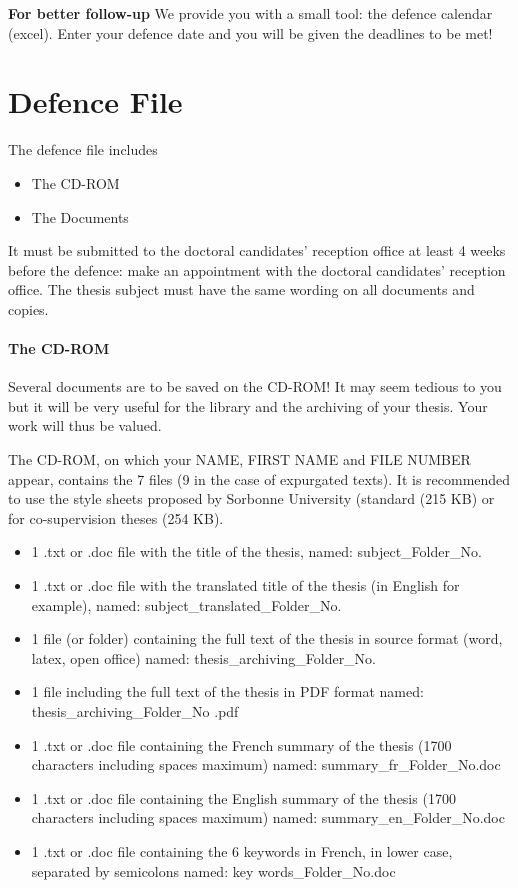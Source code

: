 \textbf{For better follow-up}
We provide you with a small tool: the defence calendar (excel). Enter your defence date and you will be given the deadlines to be met!

\section{Defence File}
\label{sec:defence-file}

The defence file includes

\begin{itemize}
    \item The CD-ROM
    \item The Documents
\end{itemize}

It must be submitted to the doctoral candidates' reception office at least 4 weeks before the defence: make an appointment with the doctoral candidates' reception office.
The thesis subject must have the same wording on all documents and copies.

\paragraph{The CD-ROM}
Several documents are to be saved on the CD-ROM! It may seem tedious to you but it will be very useful for the library and the archiving of your thesis. Your work will thus be valued. 

The CD-ROM, on which your NAME, FIRST NAME and FILE NUMBER appear, contains the 7 files (9 in the case of expurgated texts). It is recommended to use the style sheets proposed by Sorbonne University (standard (215 KB) or for co-supervision theses (254 KB). 

\begin{itemize}
    \item 1 .txt or .doc file with the title of the thesis, named: subject\_Folder\_No.
    \item 1 .txt or .doc file with the translated title of the thesis (in English for example), named: subject\_translated\_Folder\_No.
    \item 1 file (or folder) containing the full text of the thesis in source format (word, latex, open office) named: thesis\_archiving\_Folder\_No.
    \item 1 file including the full text of the thesis in PDF format named:
    thesis\_archiving\_Folder\_No .pdf
    \item 1 .txt or .doc file containing the French summary of the thesis (1700 characters including spaces maximum) named: summary\_fr\_Folder\_No.doc
    \item 1 .txt or .doc file containing the English summary of the thesis (1700 characters including spaces maximum) named: summary\_en\_Folder\_No.doc
    \item 1 .txt or .doc file containing the 6 keywords in French, in lower case, separated by semicolons named: key words\_Folder\_No.doc
\end{itemize}

